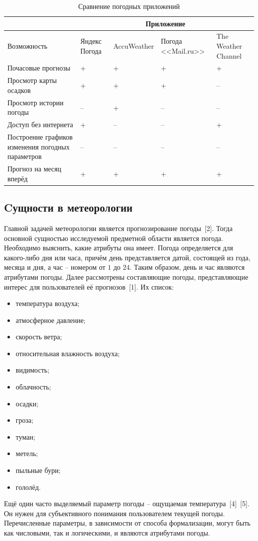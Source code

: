 \begin{table}[H]
    \centering
    \begin{tabular} { | m{63mm} | m{16mm} | m{27mm} | m{20mm} | m{18mm} | }
        \hline
        \hspace{0pt} & \multicolumn{4}{|c|}{Приложение} \\
        \hline
            Возможность & Яндекс Погода & AccuWeather & Погода <<Mail.ru>> & The Weather Channel \\
        \hline
            Почасовые прогнозы & + & + & + & + \\
        \hline
            Просмотр карты осадков & + & + & + & -- \\
        \hline
            Просмотр истории погоды & -- & + & -- & -- \\
        \hline
            Доступ без интернета & + & -- & -- & + \\
        \hline
            Построение графиков изменения погодных параметров & -- & -- & -- & -- \\
        \hline
            Прогноз на месяц вперёд & + & + & + & + \\
        \hline
        \end{tabular}
    \caption{\centering Сравнение погодных приложений}
    \label{table:app_cmp}
\end{table}

\subsection{Cущности в метеорологии}
Главной задачей метеорологии является прогнозирование погоды~[2].
Тогда основной сущностью исследуемой предметной области является погода.
Необходимо выяснить, какие атрибуты она имеет.
Погода определяется для какого-либо дня или часа, причём день представляется датой, состоящей из года, месяца и дня, а час -- номером от $1$ до $24$.
Таким образом, день и час являются атрибутами погоды.
Далее рассмотрены составляющие погоды, представляющие интерес для пользователей её прогнозов~[1]. 
Их список:
\begin{itemize}
    \item температура воздуха;
    \item атмосферное давление;
    \item скорость ветра;
    \item относительная влажность воздуха;
    \item видимость;
    \item облачность;
    \item осадки;
    \item гроза;
    \item туман;
    \item метель;
    \item пыльные бури;
    \item гололёд.
\end{itemize}
Ещё один часто выделяемый параметр погоды -- ощущаемая температура~[4]~[5].
Он нужен для субъективного понимания пользователем текущей погоды.
Перечисленные параметры, в зависимости от способа формализации, могут быть как числовыми, так и логическими, и являются атрибутами погоды.

